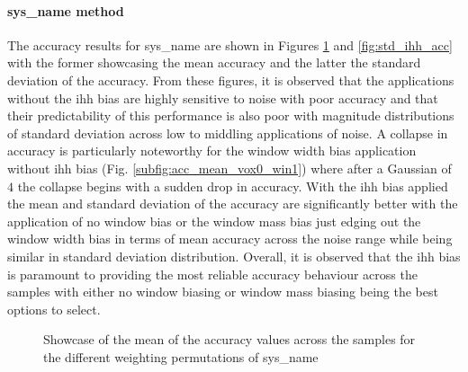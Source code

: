 \paragraph{\gls{sys_name} method} The accuracy results for \gls{sys_name} are shown in Figures \ref{fig:mean_ihh_acc} and \ref{fig:std_ihh_acc} with the former showcasing the mean accuracy and the latter the standard deviation of the accuracy. From these figures, it is observed that the applications without the \gls{ihh} bias are highly sensitive to noise with poor accuracy and that their predictability of this performance is also poor with magnitude distributions of standard deviation across low to middling applications of noise. A collapse in accuracy is particularly noteworthy for the window width bias application without \gls{ihh} bias (Fig. \ref{subfig:acc_mean_vox0_win1}) where after a Gaussian of $4$ the collapse begins with a sudden drop in accuracy. With the \gls{ihh} bias applied the mean and standard deviation of the accuracy are significantly better with the application of no window bias or the window mass bias just edging out the window width bias in terms of mean accuracy across the noise range while being similar in standard deviation distribution. Overall, it is observed that the \gls{ihh} bias is paramount to providing the most reliable accuracy behaviour across the samples with either no window biasing or window mass biasing being the best options to select.
\begin{figure}[h!]
    \centering
    \caption[Showcase of the mean of the accuracy values across the samples for the different weighting permutations of AHT]{Showcase of the mean of the accuracy values across the samples for the different weighting permutations of \gls{sys_name}}
    \label{fig:mean_ihh_acc}
\end{figure}

